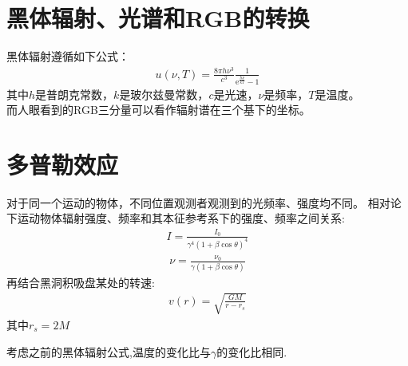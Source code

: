 \documentclass[a4paper, 12pt]{article}
\begin{document}
    \section{黑体辐射、光谱和RGB的转换}
    黑体辐射遵循如下公式：
    \begin{align*}
        u(\nu,T) = \frac{8\pi h\nu^3}{c^3} \frac{1}{\mathrm e^{\frac{h\nu}{kT}} - 1}
    \end{align*}
    其中$h$是普朗克常数，$k$是玻尔兹曼常数，$c$是光速，$\nu$是频率，$T$是温度。\\

    而人眼看到的RGB三分量可以看作辐射谱在三个基下的坐标。

    \section{多普勒效应}
    对于同一个运动的物体，不同位置观测者观测到的光频率、强度均不同。
    相对论下运动物体辐射强度、频率和其本征参考系下的强度、频率之间关系:
    \begin{align*}
        I = \frac{I_0}{\gamma^4(1+\beta\cos\theta)^4}
    \end{align*}
    \begin{align*}
        \nu = \frac{\nu_0}{\gamma(1+\beta\cos\theta)}
    \end{align*}
    再结合黑洞积吸盘某处的转速:
    \begin{align*}
        v(r) = \sqrt{\frac{GM}{r - r_s}}
    \end{align*}
    其中$r_s = 2M$\par
    考虑之前的黑体辐射公式,温度的变化比与$\gamma$的变化比相同.
\end{document}
